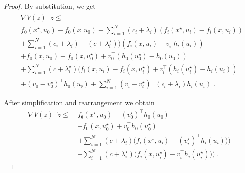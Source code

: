 \documentclass[journal,twoside,web]{ieeecolor}
\begin{document}
\begin{proof}
By substitution, we get
\begin{align}
&\nabla V(z)^\top \dot z \leq\nonumber\\ &f_0(x^\star,u_0)-f_0(x,u_0)+  \sum_{i=1}^N(c_i+\lambda_i) (f_i(x^\star,u_i)-f_i(x,u_i))\nonumber\\
&+ \sum_{i=1}^N(c_i+\lambda_i)-(c+\lambda_i^\star))(f_i(x,u_i)-v_i^\top h_i(u_i))\nonumber\\
&+f_0(x,u_0)-f_0(x,u_0^\star)+v_0^\top (h_0(u_0^\star)-h_0(u_0))\nonumber\\
&+ \sum_{i=1}^N (c+\lambda_i^\star) (f_i(x,u_i)-f_i(x,u_i^\star)+v_i^\top (h_i(u_i^\star)-h_i(u_i))\nonumber\\
&+(v_0-v_0^\star)^\top h_0(u_0)+  \sum_{i=1}^N (v_{i}-v_{i}^\star)^\top(c_i+\lambda_i) h_{i}(u_i)\;. \label{vdot_first}
\end{align}

After simplification and rearrangement we obtain
\begin{align*}
\nabla V(z)^\top \dot z\leq \; & f_0(x^\star,u_0)-(v_0^\star)^\top
h_0(u_0)\\
&-f_0(x,u_0^\star)+v_0^\top h_0(u_0^\star)\\
&+\sum_{i=1}^N(c+\lambda_i) \Big(f_i(x^\star,u_i)-(v_i^\star)^\top h_i(u_i))\Big)\\
&-\sum_{i=1}^N(c+\lambda_i^\star) \Big(f_i(x,u_i^\star)-v_i^\top h_i(u_i^\star))\Big)\;.
\end{align*}


\end{proof}
\end{document}
